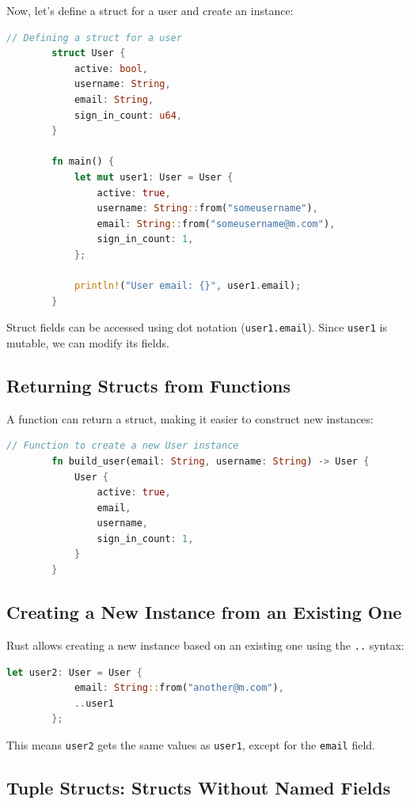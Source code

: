 \documentclass[a4paper,12pt]{report}
\begin{document}
	\noindent Now, let’s define a struct for a user and create an instance:
	
	\begin{lstlisting}[language=Rust]
		// Defining a struct for a user
		struct User {
			active: bool,
			username: String,
			email: String,
			sign_in_count: u64,
		}
		
		fn main() {
			let mut user1: User = User {
				active: true,
				username: String::from("someusername"),
				email: String::from("someusername@m.com"),
				sign_in_count: 1,
			};
			
			println!("User email: {}", user1.email);
		}
	\end{lstlisting}
	
	\noindent Struct fields can be accessed using dot notation (\texttt{user1.email}). Since \texttt{user1} is mutable, we can modify its fields.
	
	\subsection*{Returning Structs from Functions}
	
	A function can return a struct, making it easier to construct new instances:
	
	\begin{lstlisting}[language=Rust]
		// Function to create a new User instance
		fn build_user(email: String, username: String) -> User {
			User {
				active: true,
				email,
				username,
				sign_in_count: 1,
			}
		}
	\end{lstlisting}
	
	\subsection*{Creating a New Instance from an Existing One}
	
	Rust allows creating a new instance based on an existing one using the \texttt{..} syntax:
	
	\begin{lstlisting}[language=Rust]
		let user2: User = User {
			email: String::from("another@m.com"),
			..user1
		};
	\end{lstlisting}
	
	\noindent This means \texttt{user2} gets the same values as \texttt{user1}, except for the \texttt{email} field.
	
	\subsection*{Tuple Structs: Structs Without Named Fields}
	
\end{document}
